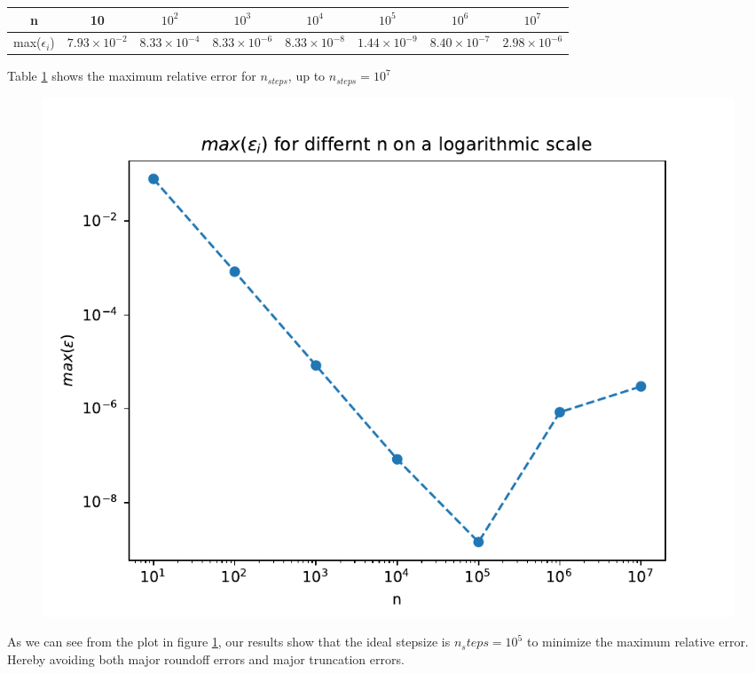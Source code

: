 \documentclass[english,notitlepage]{revtex4-1}  %
\begin{document}
\begin{enumerate}[label= \alph*)]
\begin{table}
    \label{tab:table}
    \begin{tabular}{|c|c|c|c|c|c|c|c|}
      \hline
      n  & 10 & $10^2$ & $10^3$ & $10^4$ & $10^5$& $10^6$ &$10^7$ \\
      \hline
      max($\epsilon_i$) &
      $7.93\times 10^{-2}$ &
      $8.33\times 10^{-4}$ &
      $8.33\times10^{-6}$  &
      $8.33\times10^{-8}$ &
      $1.44\times10^{-9}$  &
      $8.40\times10^{-7}$  &
      $2.98\times10^{-6}$\\
      \hline
    \end{tabular}
  \end{table}
  Table \ref{tab:table} shows the maximum relative error for $n_{steps}$, up to $n_{steps} = 10^7$


  \begin{figure}[H]
    \centering
    \includegraphics[width=.7\textwidth]{../figures/max_rel_error.pdf}
    \caption{}
    \label{fig:max_rel_error}
  \end{figure}
As we can see from the plot in figure \ref{fig:max_rel_error}, our results show that the ideal stepsize is $n_steps = 10^5$ to minimize the maximum relative error. Hereby avoiding both major roundoff errors and major truncation errors.
\end{enumerate}
\end{document}
